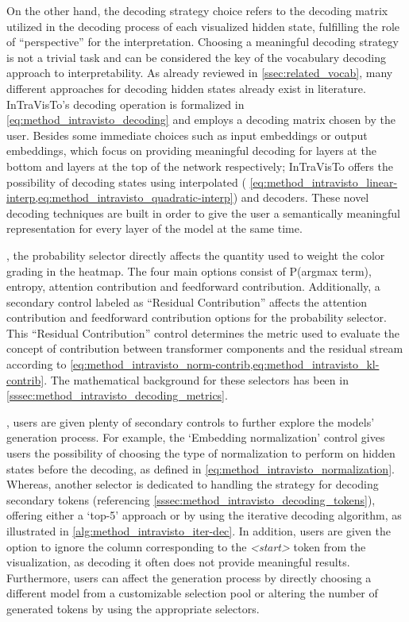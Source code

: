 On the other hand, the decoding strategy choice refers to the decoding matrix utilized in the decoding process of each visualized hidden state, fulfilling the role of ``perspective'' for the interpretation.
Choosing a meaningful decoding strategy is not a trivial task and can be considered the key  of the vocabulary decoding approach to interpretability.
As already reviewed in \cref{ssec:related_vocab}, many different approaches for decoding hidden states already exist in literature.
InTraVisTo's decoding operation is formalized in \cref{eq:method_intravisto_decoding} and employs a decoding matrix chosen by the user.
Besides some immediate choices such as input embeddings or output embeddings, which focus on providing meaningful decoding for layers at the bottom and layers at the top of the network respectively; InTraVisTo offers the possibility of decoding states using interpolated ( \cref{eq:method_intravisto_linear-interp,eq:method_intravisto_quadratic-interp}) and  decoders.
These novel decoding techniques are built in order to give the user a semantically meaningful representation for every layer of the model at the same time.

, the probability selector directly affects the quantity used to weight the color grading in the heatmap.
The four main options consist of P(argmax term), entropy, attention contribution and feedforward contribution.
Additionally, a secondary control labeled as ``Residual Contribution'' affects the attention contribution and feedforward contribution options for the probability selector.
This ``Residual Contribution'' control determines the metric used to evaluate the concept of contribution between transformer components and the residual stream according to \cref{eq:method_intravisto_norm-contrib,eq:method_intravisto_kl-contrib}.
The mathematical background for these selectors has been  in \cref{sssec:method_intravisto_decoding_metrics}.

, users are given plenty of secondary controls to further explore the models' generation process.
For example, the `Embedding normalization' control gives users the possibility of choosing the type of normalization to perform on hidden states before the decoding, as defined in \cref{eq:method_intravisto_normalization}.
Whereas, another selector is dedicated to handling the strategy for decoding secondary tokens (referencing \cref{sssec:method_intravisto_decoding_tokens}), offering either a `top-5' approach or by using the iterative decoding algorithm, as illustrated in \cref{alg:method_intravisto_iter-dec}.
In addition, users are given the option to ignore the column corresponding to the \emph{<start>} token from the visualization, as decoding it often does not provide meaningful results.
Furthermore, users can affect the generation process by directly choosing a different model from a customizable selection pool or altering the number of generated tokens by using the appropriate selectors.

